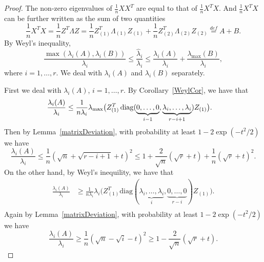 \begin{proof}
    The non-zero eigenvalues of $\frac{1}{n}XX^T$ are equal to that of $\frac{1}{n}X^T X$.
    And $\frac{1}{n}X^T X$ can be further written as the sum of two quantities
    \begin{equation*}
        \frac{1}{n}X^T X=\frac{1}{n}Z^T \Lambda Z=\frac{1}{n}Z_{(1)}^T \Lambda_{(1)} Z_{(1)} +\frac{1}{n}Z_{(2)}^T \Lambda_{(2)} Z_{(2)} \overset{def}{=}A+B.
    \end{equation*}
    By Weyl's inequality,
    \begin{equation}\label{PCA19}
        \frac{\max(\lambda_i(A),\lambda_i(B))}{\lambda_i}\leq\frac{\hat{\lambda}_i}{\lambda_i}\leq \frac{\lambda_i(A)}{\lambda_i} +\frac{\lambda_{\max}(B)}{\lambda_i},
    \end{equation}
    where $i=1,\ldots, r$. We deal with $\lambda_i(A)$ and $\lambda_i(B)$ separately.

    First we deal with ${\lambda_i(A)}$, $ i=1,\ldots, r$.
    By Corollary~\ref{WeylCor}, we have that
    \begin{equation*}
        \begin{aligned}
            \frac{\lambda_i(A)}{\lambda_i}&\leq
            \frac{1}{n\lambda_i}\lambda_{\max}\big(Z_{(1)}^T \operatorname{diag}(\underbrace{0,\ldots,0}_{i-1},\underbrace{\lambda_i,\ldots,\lambda_i}_{r-i+1}) Z_{(1)} \big).
        \end{aligned}
    \end{equation*}
    Then by Lemma~\ref{matrixDeviation}, with probability at least $1-2\exp(-t^2/2)$ we have 
    \begin{equation}\label{eigenvalueTheorem:2}
    \frac{\lambda_i(A)}{\lambda_i}\leq
    \frac{1}{n}{(\sqrt{n}+\sqrt{r-i+1}+t)}^2
    \leq
    1+\frac{2}{\sqrt{n}}(\sqrt{r}+t)+\frac{1}{n}(\sqrt{r}+t)^2.
\end{equation}
    On the other hand, by Weyl's inequility, we have that
\begin{equation*}
    \begin{aligned}
        \frac{\lambda_i(A)}{\lambda_i}&\geq
        \frac{1}{n\lambda_i}\lambda_{i}\big(Z_{(1)}^T \mathrm{diag}(\underbrace{\lambda_i,\ldots,\lambda_i}_{i},\underbrace{0,\ldots,0}_{r-i}) Z_{(1)} \big).\\
    \end{aligned}
\end{equation*}
    Again by Lemma~\ref{matrixDeviation}, with probability at least $1-2\exp(-t^2/2)$ we have 
\begin{equation}\label{eigenvalueTheorem:3}
        \frac{\lambda_i(A)}{\lambda_i}\geq
        \frac{1}{n}{(\sqrt{n}-\sqrt{i}-t)}^2
        \geq 1-\frac{2}{\sqrt{n}}(\sqrt{r}+t).
\end{equation}


\end{proof}
